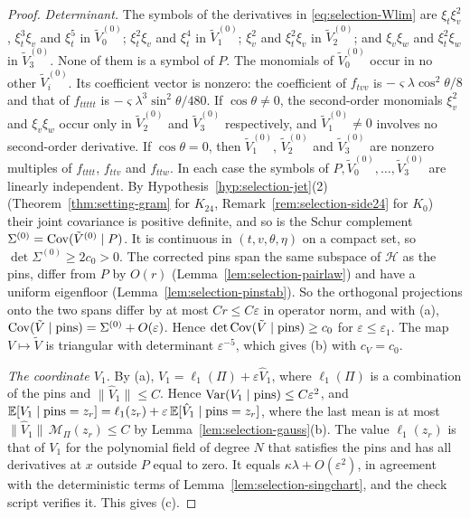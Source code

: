 \begin{proof}
\emph{Determinant.} The symbols of the derivatives in \eqref{eq:selection-Wlim} are $\xi_t\xi_v^2$, $\xi_t^3\xi_v$ and $\xi_t^5$ in $\tilde V^{(0)}_0$; $\xi_t^2\xi_v$ and $\xi_t^4$ in $\tilde V^{(0)}_1$; $\xi_v^2$ and $\xi_t^2\xi_v$ in $\tilde V^{(0)}_2$; and $\xi_v\xi_w$ and $\xi_t^2\xi_w$ in $\tilde V^{(0)}_3$. None of them is a symbol of $P$. The monomials of $\tilde V^{(0)}_0$ occur in no other $\tilde V^{(0)}_i$. Its coefficient vector is nonzero: the coefficient of $f_{tvv}$ is $-\varsigma\lambda\cos^2\theta/8$ and that of $f_{ttttt}$ is $-\varsigma\lambda^3\sin^2\theta/480$. If $\cos\theta\ne0$, the second-order monomials $\xi_v^2$ and $\xi_v\xi_w$ occur only in $\tilde V^{(0)}_2$ and $\tilde V^{(0)}_3$ respectively, and $\tilde V^{(0)}_1\ne0$ involves no second-order derivative. If $\cos\theta=0$, then $\tilde V^{(0)}_1$, $\tilde V^{(0)}_2$ and $\tilde V^{(0)}_3$ are nonzero multiples of $f_{tttt}$, $f_{ttv}$ and $f_{ttw}$. In each case the symbols of $P,\tilde V^{(0)}_0,\dots,\tilde V^{(0)}_3$ are linearly independent. By Hypothesis~\ref{hyp:selection-jet}(2) (Theorem~\ref{thm:setting-gram} for $K_{24}$, Remark~\ref{rem:selection-side24} for $K_0$) their joint covariance is positive definite, and so is the Schur complement $\Sigma^{(0)}=\operatorname{Cov}(\tilde V^{(0)}\mid P)$. It is continuous in $(t,v,\theta,\eta)$ on a compact set, so $\det\Sigma^{(0)}\ge2c_0>0$. The corrected pins span the same subspace of $\mathcal H$ as the pins, differ from $P$ by $O(r)$ (Lemma~\ref{lem:selection-pairlaw}) and have a uniform eigenfloor (Lemma~\ref{lem:selection-pinstab}). So the orthogonal projections onto the two spans differ by at most $Cr\le C\varepsilon$ in operator norm, and with (a), $\operatorname{Cov}(\tilde V\mid\text{pins})=\Sigma^{(0)}+O(\varepsilon)$. Hence $\det\operatorname{Cov}(\tilde V\mid\text{pins})\ge c_0$ for $\varepsilon\le\varepsilon_1$. The map $V\mapsto\tilde V$ is triangular with determinant $\varepsilon^{-5}$, which gives (b) with $c_V=c_0$.

\emph{The coordinate $V_1$.} By (a), $V_1=\ell_1(\Pi)+\varepsilon\hat V_1$, where $\ell_1(\Pi)$ is a combination of the pins and $\|\hat V_1\|\le C$. Hence $\operatorname{Var}(V_1\mid\text{pins})\le C\varepsilon^2$, and $\mathbb E[V_1\mid\text{pins}=z_r]=\ell_1(z_r)+\varepsilon\,\mathbb E[\hat V_1\mid\text{pins}=z_r]$, where the last mean is at most $\|\hat V_1\|\,\mathcal M_\Pi(z_r)\le C$ by Lemma~\ref{lem:selection-gauss}(b). The value $\ell_1(z_r)$ is that of $V_1$ for the polynomial field of degree $N$ that satisfies the pins and has all derivatives at $x$ outside $P$ equal to zero. It equals $\kappa\lambda+O(\varepsilon^2)$, in agreement with the deterministic terms of Lemma~\ref{lem:selection-singchart}, and the check script verifies it. This gives (c).


\end{proof}
